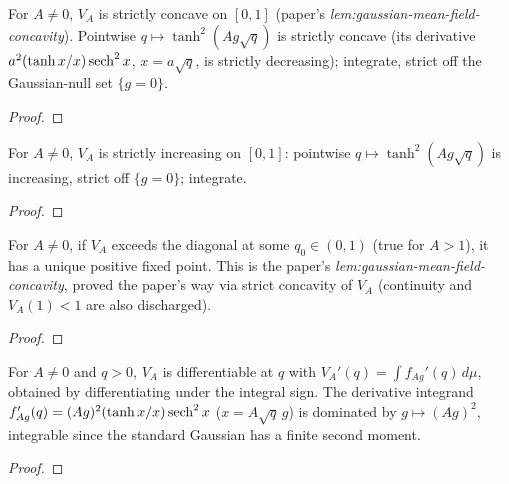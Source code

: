 \begin{lemma}
  \label{lem:V-concave}
  \leanok
  For $A\neq0$, $V_A$ is strictly concave on $[0,1]$ (paper's
  \emph{lem:gaussian-mean-field-concavity}). Pointwise $q\mapsto\tanh^2(A g\sqrt q)$
  is strictly concave (its derivative $a^2(\tanh x/x)\operatorname{sech}^2 x$, $x=a\sqrt q$, is
  strictly decreasing); integrate, strict off the Gaussian-null set $\{g=0\}$.
\end{lemma}
\begin{proof}\leanok{}\end{proof}

\begin{lemma}
  \label{lem:V-mono}
  \leanok
  For $A\neq0$, $V_A$ is strictly increasing on $[0,1]$: pointwise
  $q\mapsto\tanh^2(A g\sqrt q)$ is increasing, strict off $\{g=0\}$; integrate.
\end{lemma}
\begin{proof}\leanok{}\end{proof}

\begin{theorem}
  \label{thm:V-fixed-uncond}
  \leanok
  For $A\neq0$, if $V_A$ exceeds the diagonal at some $q_0\in(0,1)$ (true for $A>1$),
  it has a unique positive fixed point. This is the paper's
  \emph{lem:gaussian-mean-field-concavity}, proved the paper's way via strict concavity
  of $V_A$ (continuity and $V_A(1)<1$ are also discharged).
\end{theorem}
\begin{proof}\leanok{}\end{proof}

\begin{lemma}
  \label{lem:V-deriv}
  \leanok
  For $A\neq0$ and $q>0$, $V_A$ is differentiable at $q$ with
  $V_A'(q)=\int f_{Ag}'(q)\,d\mu$, obtained by differentiating under the integral sign.
  The derivative integrand $f_{Ag}'(q)=(Ag)^2(\tanh x/x)\operatorname{sech}^2 x$ ($x=A\sqrt q\,g$) is
  dominated by $g\mapsto(Ag)^2$, integrable since the standard Gaussian has a finite
  second moment.
\end{lemma}
\begin{proof}\leanok\end{proof}

